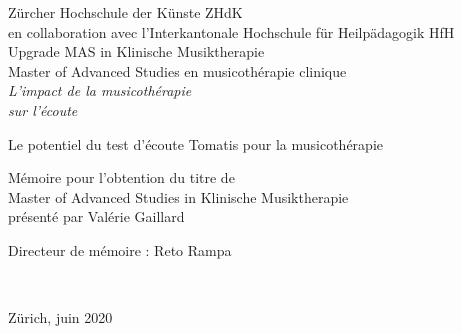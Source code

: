 
\begin{titlepage}
 \begin{center}
    {\Large
     Zürcher Hochschule der Künste ZHdK\\
 	en collaboration avec l'Interkantonale Hochschule für
        Heilpädagogik HfH \\
	 Upgrade MAS in Klinische Musiktherapie \\ Master of Advanced Studies en musicothérapie clinique\\}
  \vfill
  {\Huge \emph{L'impact de la musicothérapie\\ sur l'écoute}} \medskip


{\LARGE Le potentiel du test d'écoute Tomatis pour la musicothérapie} \vfill

{\Large Mémoire pour l'obtention du titre de\\ \medskip
Master of Advanced Studies in Klinische Musiktherapie \\ \smallskip 
présenté par Valérie Gaillard}

{\large Directeur de mémoire : Reto Rampa}



	 \hfill \\
	 \rule{0mm}{1pt} \hfill
{\large Zürich, juin 2020}
 \end{center}
\end{titlepage}
